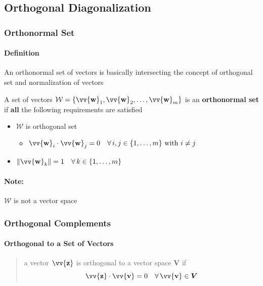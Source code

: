 \documentclass[11pt]{article}
\DeclareRobustCommand{\myvec}[1]{\vv{\mathbf{#1}}}
\newcommand{\mysubvecsp}[1]{\bm{{#1}}}
\newcommand{\myset}[1]{\mathcal{#1}}
\newcommand{\dotprod}[2]{#1 \cdot #2}
\begin{document}
    \subsection{Orthogonal Diagonalization}
    \subsubsection{Orthonormal Set}
    \paragraph{Definition}

    An orthonormal set of vectors is basically intersecting the concept of orthogonal set and normalization of vectors
    \vspace{1ex}

    A set of vectors $\myset{W} = \{\myvec{w}_1, \myvec{w}_2, \dots, \myvec{w}_m\}$ is an \textbf{orthonormal set} \\
    if \textbf{all} the following requirements are satisfied
    \begin{itemize}
        \item $\myset{W}$ is orthogonal set
        \begin{itemize}
            \item $\dotprod{\myvec{w}_i}{\myvec{w}_j} = 0 \quad \forall\,i, j \in \{1, \dots, m\} \text{ with } i \neq j$
        \end{itemize}
        \item $\|\myvec{w}_k\| = 1 \quad \forall\,k \in \{1, \dots, m\}$
    \end{itemize}
    \paragraph{Note:} $\myset{W}$ is not a vector space

    
    \subsubsection{Orthogonal Complements}
    \paragraph{Orthogonal to a Set of Vectors}
    \begin{quote}
        a vector $\myvec{z}$ is orthogonal to a vector space $\mysubvecsp{V}$ if \\
        \[ \dotprod{\myvec{z}}{\myvec{v}} = 0 \quad \forall\,\myvec{v} \in \mysubvecsp{V} \]
    \end{quote}
    
\end{document}

